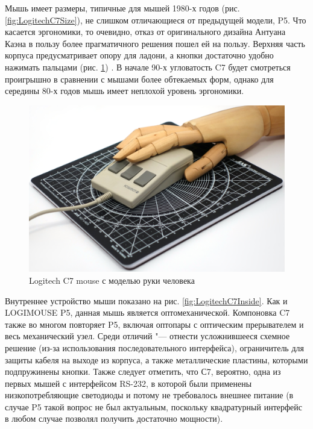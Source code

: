 \documentclass[11pt, a4paper]{article}
\begin{document}
Мышь имеет размеры, типичные для мышей 1980-х годов (рис. \ref{fig:LogitechC7Size}), не слишком отличающиеся от предыдущей модели, P5. Что касается эргономики, то очевидно, отказ от оригинального дизайна Антуана Каэна в пользу более прагматичного решения пошел ей на пользу. Верхняя часть корпуса предусматривает опору для ладони, а кнопки достаточно удобно нажимать пальцами (рис. \ref{fig:LogitechC7Hand}) \cite{manual1, manual2}. В начале 90-х угловатость C7 будет смотреться 
проигрышно в сравнении с мышами более обтекаемых форм, однако для середины 80-х годов мышь имеет неплохой уровень эргономики.

\begin{figure}[h]
    \centering
    \includegraphics[scale=0.35]{1985_logitech_c7_mouse/hand_30.jpg}
    \caption{Logitech C7 mouse с моделью руки человека}
    \label{fig:LogitechC7Hand}
\end{figure}

Внутреннее устройство мыши показано на рис. \ref{fig:LogitechC7Inside}. Как и LOGIMOUSE P5, данная мышь является оптомеханической. Компоновка C7 также во многом повторяет P5, включая оптопары с оптическим прерывателем и весь механический узел. Среди отличий "---  отнести усложнившееся схемное решение (из-за использования последовательного интерфейса), ограничитель для защиты кабеля на выходе из корпуса, а также металлические пластины, которыми подпружинены кнопки. Также следует отметить, что С7, вероятно, одна из первых мышей с интерфейсом RS-232, в которой были применены низкопотребляющие светодиоды и потому не требовалось внешнее питание (в случае P5 такой вопрос не был актуальным, поскольку квадратурный интерфейс в любом случае позволял получить достаточно мощности).
\end{document}
